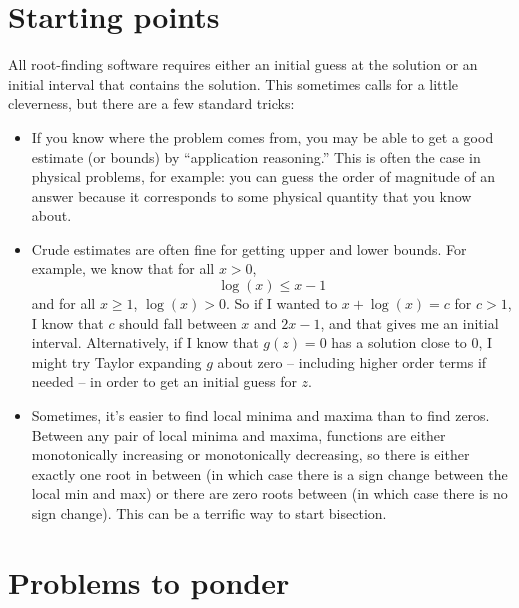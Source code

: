 \documentclass[12pt, leqno]{article} %
\begin{document}
\section*{Starting points}


All root-finding software requires either an initial guess at the
solution or an initial interval that contains the solution.  This
sometimes calls for a little cleverness, but there are a few standard
tricks:
\begin{itemize}
\item
  If you know where the problem comes from, you may be able to get a
  good estimate (or bounds) by ``application reasoning.''  This is
  often the case in physical problems, for example: you can guess the
  order of magnitude of an answer because it corresponds to some
  physical quantity that you know about.
\item
  Crude estimates are often fine for getting upper and lower bounds.
  For example, we know that for all $x > 0$,
  \[
    \log(x) \leq x-1
  \]
  and for all $x \geq 1$, $\log(x) > 0$.  So if I wanted to $x +
  \log(x) = c$ for $c > 1$, I know that $c$ should fall between $x$
  and $2x-1$, and that gives me an initial interval.  Alternatively,
  if I know that $g(z) = 0$ has a solution close to $0$, I might try
  Taylor expanding $g$ about zero -- including higher order terms if
  needed -- in order to get an initial guess for $z$.
\item
  Sometimes, it's easier to find local minima and maxima than to find
  zeros.  Between any pair of local minima and maxima, functions are
  either monotonically increasing or monotonically decreasing, so
  there is either exactly one root in between (in which case there is a sign
  change between the local min and max) or there are zero roots
  between (in which case there is no sign change).  This can be a
  terrific way to start bisection.
\end{itemize}

\section*{Problems to ponder}
\end{document}
